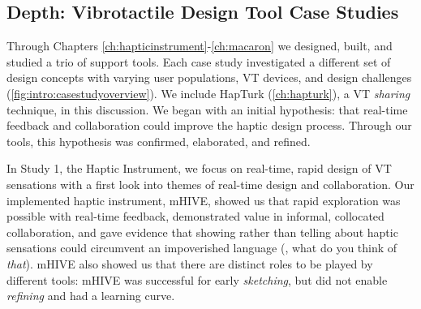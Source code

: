 \subsection{Depth: Vibrotactile Design Tool Case Studies}
Through Chapters \ref{ch:hapticinstrument}-\ref{ch:macaron} we designed, built, and studied a trio of \haxd support tools.
Each case study investigated a different set of design concepts with varying user populations, VT devices, and design challenges (\autoref{fig:intro:casestudyoverview}).
We include HapTurk (\autoref{ch:hapturk}), a VT \emph{sharing} technique, in this discussion.
We began with an initial hypothesis: that real-time feedback and collaboration could improve the haptic design process.
Through our tools, this hypothesis was confirmed, elaborated, and refined.

In Study 1, the Haptic Instrument, we focus on real-time, rapid design of VT sensations with a first look into themes of real-time design and collaboration.
Our implemented haptic instrument, mHIVE, showed us that rapid exploration was possible with real-time feedback, demonstrated value in informal, collocated collaboration, and gave evidence that showing rather than telling about haptic sensations could circumvent an impoverished language (\eg, what do you think of \emph{that}).
 mHIVE also showed us that there are distinct roles to be played by different tools: mHIVE was successful for early \emph{sketching}, but did not enable \emph{refining} and had a learning curve.


